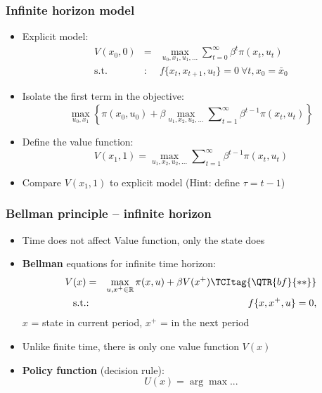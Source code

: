 \documentclass[bigger,handout]{beamer}
\newenvironment{stepitemize}{\begin{itemize}[<+->]}{\end{itemize} }
\begin{document}
\begin{frame}%

\frametitle{Infinite horizon model}

\begin{stepitemize}
\item Explicit model:%
\begin{eqnarray*}
V(x_{0},0) &=&\max_{u_{0},x_{1},u_{1},...}\sum\nolimits_{t=0}^{\infty }\beta
^{t}\pi (x_{t},u_{t}) \\
\text{s.t.} &\text{:}&f\{x_{t},x_{t+1},u_{t}\}=0\ \forall t,x_{0}=\bar{x}_{0}
\end{eqnarray*}

\item Isolate the first term in the objective:%
\begin{equation*}
\max_{u_{0},x_{1}}\left\{ \pi (x_{0},u_{0})+\beta
\max_{u_{1},x_{2},u_{2},...}\sum\nolimits_{t=1}^{\infty }\beta ^{t-1}\pi
(x_{t},u_{t})\right\}
\end{equation*}

\item Define the value function:%
\begin{equation*}
V(x_{1},1)=\max_{u_{1},x_{2},u_{2},...}\sum\nolimits_{t=1}^{\infty }\beta
^{t-1}\pi (x_{t},u_{t})
\end{equation*}

\item Compare $V(x_{1},1)$ to explicit model (Hint: define $\tau =t-1$)
\end{stepitemize}



\end{frame}%



\begin{frame}%

\frametitle{Bellman principle -- infinite horizon}

\begin{stepitemize}
\item Time does not affect Value function, only the state does

\item \textbf{Bellman} equations for infinite time horizon:
\begin{eqnarray}
V(x) &=&\max_{u,x^{+}\in \mathbb{R}}\pi (x,u)+\beta V(x^{+})
\TCItag{\QTR{bf}{**}} \\
\text{s.t.} &\text{:}&f\{x,x^{+},u\}=0,  \notag
\end{eqnarray}%
$x$ = state in current period, $x^{+}$ = in the next period

\item Unlike finite time, there is only one value function $V(x)$

\item \textbf{Policy function} (decision rule):\textbf{\ }%
\begin{equation*}
U(x)=\arg \max ...
\end{equation*}
\end{stepitemize}



\end{frame}%
\end{document}
